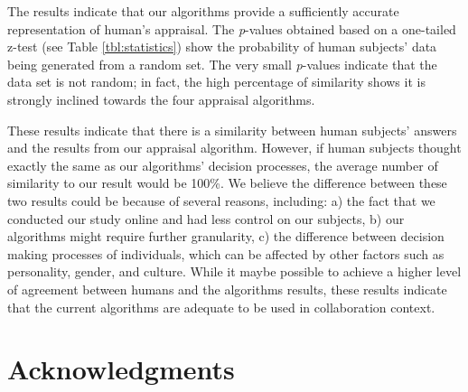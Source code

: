\documentclass{aamas2016}
\begin{document}
The results indicate that our algorithms provide a sufficiently accurate
representation of human's appraisal. The \textit{p}-values obtained based on a
one-tailed z-test (see Table \ref{tbl:statistics}) show the probability of
human subjects' data being generated from a random set. The very small
\textit{p}-values indicate that the data set is not random; in fact, the high
percentage of similarity shows it is strongly inclined towards the four
appraisal algorithms.

These results indicate that there is a similarity between human subjects'
answers and the results from our appraisal algorithm. However, if human subjects
thought exactly the same as our algorithms' decision processes, the average
number of similarity to our result would be 100\%. We believe the difference between
these two results could be because of several reasons, including: a) the fact
that we conducted our study online and had less control on our subjects, b) our
algorithms might require further granularity, c) the difference between decision
making processes of individuals, which can be affected by other factors such as
personality, gender, and culture. While it maybe possible to achieve a higher
level of agreement between humans and the algorithms results, these results
indicate that the current algorithms are adequate to be used in collaboration
context.




\section*{Acknowledgments}

%
%
%

%
\end{document}
